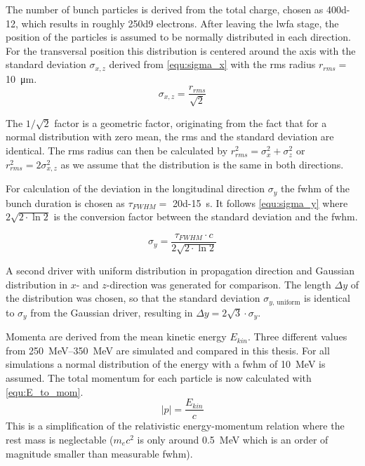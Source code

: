 \documentclass[bachelor_thesis]{subfiles}
\begin{document}
The number of bunch particles is derived from the total charge, chosen as \qty{400d-12}{\C}, which results in roughly \num{250d9} electrons. After leaving the \gls{lwfa} stage, the position of the particles is assumed to be normally distributed in each direction.
For the transversal position this distribution is centered around the axis with the standard deviation $\sigma_{x,z}$ derived from \autoref{equ:sigma_x} with the \gls{rms} radius $r_{rms}=$ \qty{10}{\um}.
\begin{equation}
	\sigma_{x,z}=\frac{r_{rms}}{\sqrt{2}} 
	\label{equ:sigma_x}
\end{equation}

The $1/\sqrt{2}$ factor is a geometric factor, originating from the fact that for a normal distribution with zero mean, the \gls{rms} and the standard deviation are identical. 
The \gls{rms} radius can then be calculated by $r_{rms}^2=\sigma_{x}^2 + \sigma_{z}^2$ or $r_{rms}^2=2\sigma_{x,z}^2$ as we assume that the distribution is the same in both directions.

For calculation of the deviation in the longitudinal direction $\sigma_y$ the \gls{fwhm} of the bunch duration is chosen as $\tau_{FWHM}=$ \qty{20d-15}{\s}. 
It follows \autoref{equ:sigma_y} where $2\sqrt{2\cdot\ln{2}}$ is the conversion factor between the standard deviation and the \gls{fwhm}.

\begin{equation}
	\sigma_{y}=\frac{\tau_{FWHM}\cdot c}{2\sqrt{2\cdot\ln{2}}}
	\label{equ:sigma_y}
\end{equation}

A second driver with uniform distribution in propagation direction and Gaussian distribution in $x$- and $z$-direction was generated for comparison. 
The length $\Delta y$ of the distribution was chosen, so that the standard deviation $\sigma_{y, \, \mathrm{uniform}}$ is identical to $\sigma_{y}$ from the Gaussian driver, resulting in $\Delta y=2 \sqrt{3}\cdot \sigma_{y}$.

Momenta are derived from the mean kinetic energy $E_{kin}$. Three different values from \qtyrange{250}{350}{\MeV} are simulated and compared in this thesis.
For all simulations a normal distribution of the energy with a \gls{fwhm} of \qty{10}{\MeV} is assumed. The total momentum for each particle is now calculated with \autoref{equ:E_to_mom}.
\begin{equation}
	\left|p\right|=\frac{E_{kin}}{c}
	\label{equ:E_to_mom}
\end{equation}
This is a simplification of the relativistic energy-momentum relation where the rest mass is neglectable ($m_{e}c^2$ is only around \qty{0.5}{\MeV} which is an order of magnitude smaller than measurable \gls{fwhm}).
\end{document}
